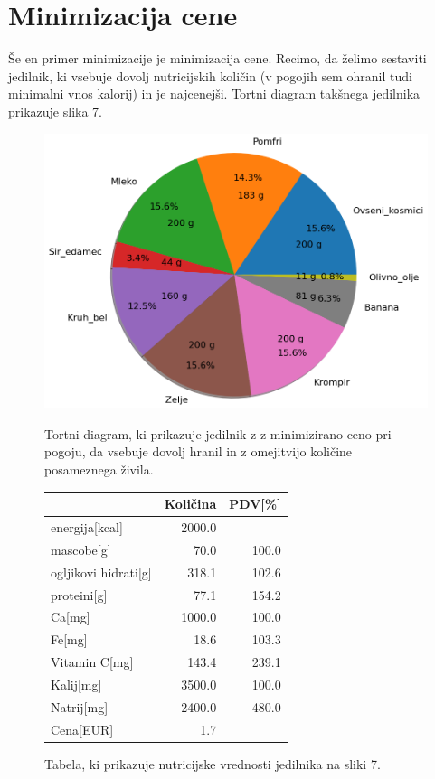 \documentclass[slovene,11pt,a4paper]{article}
\begin{document}
\section{Minimizacija cene}

Še en primer minimizacije je minimizacija cene. Recimo, da želimo sestaviti jedilnik, ki vsebuje dovolj nutricijskih količin (v pogojih sem ohranil tudi minimalni vnos kalorij) in je najcenejši. Tortni diagram takšnega jedilnika prikazuje slika 7.

\begin{figure}[h!]
  \centering
  \begin{minipage}[h]{0.56\textwidth}
    \includegraphics[width=\textwidth]{piechart4.png}
    \caption{Tortni diagram, ki prikazuje jedilnik z z minimizirano ceno pri pogoju, da 				vsebuje dovolj hranil in z omejitvijo količine posameznega živila.}
  \end{minipage}
  \hfill
  \begin{minipage}[h]{0.42\textwidth}
	\begin{tabular}{lrr}
		\toprule
		{} &  Količina &  PDV[\%] \\
		\midrule
		energija[kcal]       &    2000.0 &         \\
		mascobe[g]           &      70.0 &   100.0 \\
		ogljikovi hidrati[g] &     318.1 &   102.6 \\
		proteini[g]          &      77.1 &   154.2 \\
		Ca[mg]               &    1000.0 &   100.0 \\
		Fe[mg]               &      18.6 &   103.3 \\
		Vitamin C[mg]        &     143.4 &   239.1 \\
		Kalij[mg]            &    3500.0 &   100.0 \\
		Natrij[mg]           &    2400.0 &   480.0 \\
		Cena[EUR]            &       1.7 &         \\
		\bottomrule
	\end{tabular}
	\caption{Tabela, ki prikazuje nutricijske vrednosti jedilnika na sliki 7.}
  \end{minipage}
\end{figure}
\end{document}
